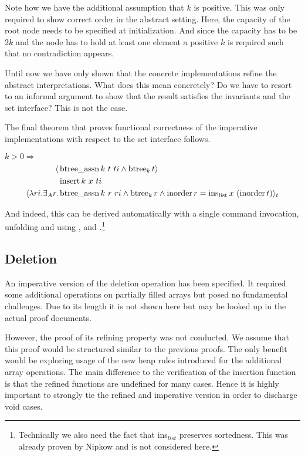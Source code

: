 Note how we have the additional assumption that $k$ is positive.
This was only required to show correct order in the abstract setting.
Here, the capacity of the root node needs to be specified at initialization.
And since the capacity has to be $2k$ and the node has to hold at least one element
a positive $k$ is required such that no contradiction appears.

Until now we have only shown that the concrete
implementations refine the abstract interpretations.
What does this mean concretely?
Do we have to resort to an informal argument to show that the result
satisfies the invariants and the set interface?
This is not the case.

The final theorem that proves functional correctness of the imperative
implementations with respect to the set interface follows.

\begin{corollary} $k > 0 \Longrightarrow$
\begin{align*}
   \langle &\operatorname{btree\_assn} k\ t\ ti \wedge \operatorname{btree}_k t \rangle \\
           &\operatorname{insert} k\ x\ ti \\
   \langle \lambda ri. \exists_A r. &\operatorname{btree\_assn} k\ r\ ri \wedge \operatorname{btree}_k r \wedge \operatorname{inorder} r = \operatorname{ins_{list}} x\ (\operatorname{inorder} t)\rangle_t
\end{align*}
\end{corollary}

And indeed, this can be derived automatically with a single command invocation,
unfolding  and using ,  and .\footnote{
    Technically we also need the fact that ins$_{list}$ preserves sortedness.
    This was already proven by Nipkow \parencite{DBLP:conf/itp/Nipkow16}
    and is not considered here.
}


\subsection{Deletion}

An imperative version of the deletion operation has been specified.
It required some additional operations on partially filled arrays but
posed no fundamental challenges.
Due to its length it is not shown here but may be looked up in the
actual proof documents.

However, the proof of its refining property was not conducted.
We assume that this proof would be structured similar to
the previous proofs.
The only benefit would be exploring usage of the new
heap rules introduced for the additional array operations.
The main difference to the verification of the
insertion function is that the refined functions
are undefined for many cases.
Hence it is highly important
to strongly tie the refined and imperative version
in order to discharge void cases.
